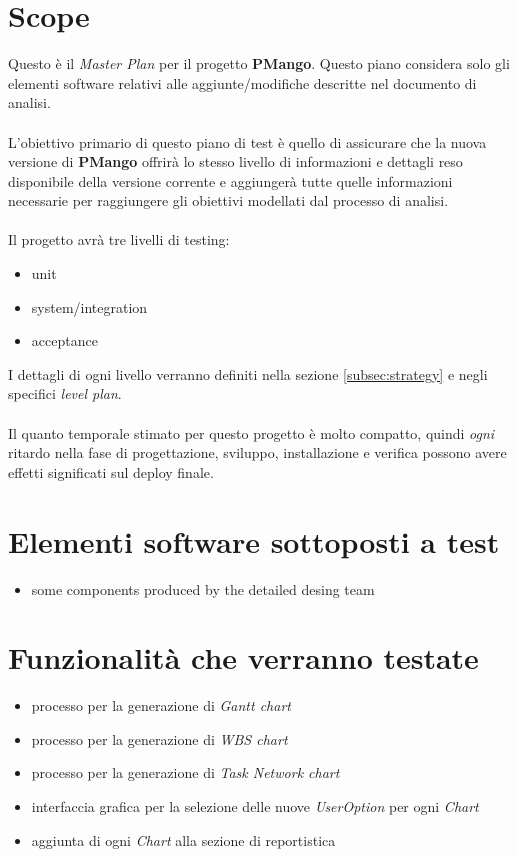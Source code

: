 \section{Scope}

Questo \`e il \emph{Master Plan} per il progetto \textbf{PMango}. Questo piano
considera solo gli elementi software relativi alle aggiunte/modifiche descritte
nel documento di analisi. \\ \\
L'obiettivo primario di questo piano di test \`e quello di assicurare che la
nuova versione di \textbf{PMango} offrir\`a lo stesso livello di informazioni e
dettagli reso disponibile della versione corrente e aggiunger\`a tutte quelle
informazioni necessarie per raggiungere gli obiettivi modellati dal processo di
analisi.
\\ \\
Il progetto avr\`a tre livelli di testing: 
\begin{itemize}
  \item unit
  \item system/integration
  \item acceptance
\end{itemize}
I dettagli di ogni livello verranno definiti nella sezione \ref{subsec:strategy}
e negli specifici \emph{level plan}. \\ \\
Il quanto temporale stimato per questo progetto \`e molto compatto, quindi
\emph{ogni} ritardo nella fase di progettazione, sviluppo, installazione e
verifica possono avere effetti significati sul deploy finale.

\section{Elementi software sottoposti a test}

\begin{itemize}
  \item some components produced by the detailed desing team
\end{itemize}

\section{Funzionalit\`a che verranno testate}
\begin{itemize}
  \item processo per la generazione di \emph{Gantt chart}
  \item processo per la generazione di \emph{WBS chart}
  \item processo per la generazione di \emph{Task Network chart}
  \item interfaccia grafica per la selezione delle nuove \emph{UserOption} per
  ogni \emph{Chart}
  \item aggiunta di ogni \emph{Chart} alla sezione di reportistica
\end{itemize}

